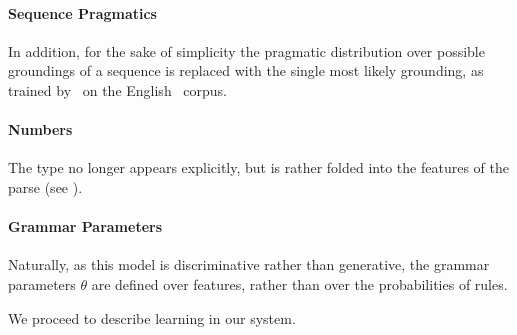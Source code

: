 \paragraph{Sequence Pragmatics}
In addition, for the sake of simplicity the pragmatic distribution over
  possible groundings of a sequence is replaced with the single most likely
  grounding, as trained by \me\ on the English \tempeval\ corpus.

\paragraph{Numbers}
The  type no longer appears explicitly, but is rather folded
  into the features of the parse (see ).

\paragraph{Grammar Parameters}
Naturally, as this model is discriminative rather than generative, the grammar
  parameters $\theta$ are defined over features, rather than over the
  probabilities of rules.


We proceed to describe learning in our system.
